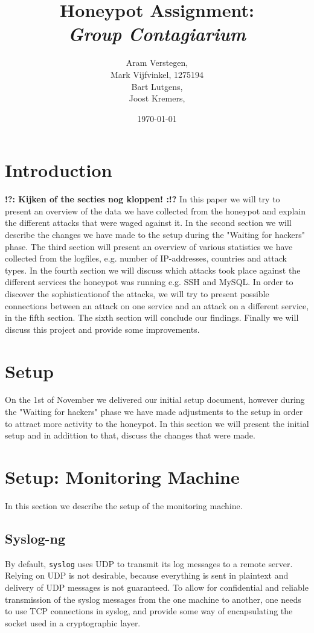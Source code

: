 \documentclass[11pt]{article}
\title{\textbf{Honeypot Assignment: \\ \emph{Group Contagiarium}}}
\author{Aram Verstegen, \tocheck{studentnummer Utwente} \\
	 Mark Vijfvinkel, 1275194 \\
	 Bart Lutgens, \tocheck{studentnummer Utwente} \\
	Joost Kremers, \tocheck{studentnummer Utwente}}
\date{\today}
\newcommand{\tocheck}[1]{{\bf !?: #1 :!?}}
\begin{document}
\maketitle


\section{Introduction}
\tocheck{Kijken of the secties nog kloppen!}
In this paper we will try to present an overview of the data we have collected from the honeypot and explain the different attacks that were waged against it. 
In the second section we will describe the changes we have made to the setup during the "Waiting for hackers" phase. 
The third section will present an overview of various statistics we have collected from the logfiles, e.g. number of IP-addresses, countries and attack types. 
In the fourth section we will discuss which attacks took place against the different services the honeypot was running e.g. SSH and MySQL.
In order to discover the sophisticationof the attacks, we will try to present possible connections between an attack on one service and an attack on a different service, in the fifth section.
The sixth section will conclude our findings. 
Finally we will discuss this project and provide some improvements. 




\section{Setup}
\label{Setup}

On the 1st of November we delivered our initial setup document, however during the "Waiting for hackers" phase we have made adjustments to the setup in order to attract more activity to the honeypot. In this section we will present the initial setup and in addittion to that, discuss the changes that were made.


\section{Setup: Monitoring Machine}

In this section we describe the setup of the monitoring machine.

\subsection{Syslog-ng}
By default, \verb|syslog| uses UDP to transmit its log messages to a remote server.
Relying on UDP is not desirable, because everything is sent in plaintext and delivery of UDP messages is not guaranteed.
To allow for confidential and reliable transmission of the syslog messages from the one machine to another, one needs to use TCP connections in syslog, and provide some way of encapsulating the socket used in a cryptographic layer.
\end{document}

